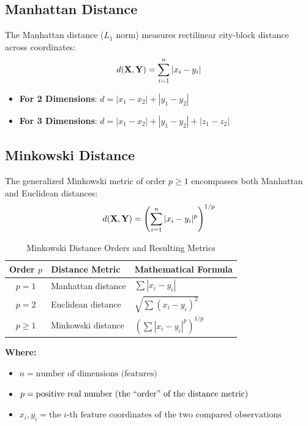 \subsection{Manhattan Distance}

The Manhattan distance ($L_1$ norm) measures rectilinear city-block distance across coordinates:
\begin{equation}
d(\mathbf{X}, \mathbf{Y}) = \sum_{i=1}^n |x_i - y_i|
\end{equation}

\begin{itemize}[leftmargin=1.5em]
    \item \textbf{For 2 Dimensions}: $d = |x_1 - x_2| + |y_1 - y_2|$
    \item \textbf{For 3 Dimensions}: $d = |x_1 - x_2| + |y_1 - y_2| + |z_1 - z_2|$
\end{itemize}

\subsection{Minkowski Distance}

The generalized Minkowski metric of order $p \ge 1$ encompasses both Manhattan and Euclidean distances:
\begin{equation}
d(\mathbf{X}, \mathbf{Y}) = \left(\sum_{i=1}^n |x_i - y_i|^p \right)^{1/p}
\end{equation}

\begin{table}[htbp]
\centering
\caption{Minkowski Distance Orders and Resulting Metrics}
\vspace{0.2em}
\begin{tabular}{cll}
\toprule
\textbf{Order} $p$ & \textbf{Distance Metric} & \textbf{Mathematical Formula} \\
\midrule
$p = 1$ & Manhattan distance & $\displaystyle \sum |x_i - y_i|$ \\
\addlinespace[0.4em]
$p = 2$ & Euclidean distance & $\displaystyle \sqrt{\sum (x_i - y_i)^2}$ \\
\addlinespace[0.4em]
$p \ge 1$ & Minkowski distance & $\displaystyle \left(\sum |x_i - y_i|^p \right)^{1/p}$ \\
\bottomrule
\end{tabular}
\end{table}

\noindent\textbf{Where:}
\begin{itemize}[leftmargin=1.5em]
    \item $n = \text{number of dimensions (features)}$
    \item $p = \text{positive real number (the \textquotedblleft order\textquotedblright\ of the distance metric)}$
    \item $x_i, y_i = \text{the } i\text{-th feature coordinates of the two compared observations}$
\end{itemize}

